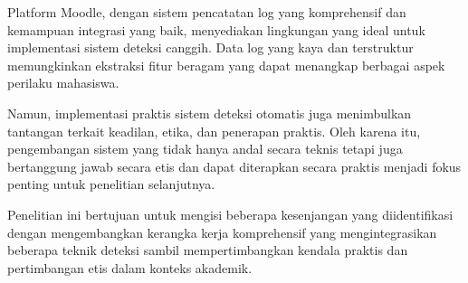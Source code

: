 Platform Moodle, dengan sistem pencatatan log yang komprehensif dan kemampuan integrasi yang baik, menyediakan lingkungan yang ideal untuk implementasi sistem deteksi canggih. Data log yang kaya dan terstruktur memungkinkan ekstraksi fitur beragam yang dapat menangkap berbagai aspek perilaku mahasiswa.

Namun, implementasi praktis sistem deteksi otomatis juga menimbulkan tantangan terkait keadilan, etika, dan penerapan praktis. Oleh karena itu, pengembangan sistem yang tidak hanya andal secara teknis tetapi juga bertanggung jawab secara etis dan dapat diterapkan secara praktis menjadi fokus penting untuk penelitian selanjutnya.

Penelitian ini bertujuan untuk mengisi beberapa kesenjangan yang diidentifikasi dengan mengembangkan kerangka kerja komprehensif yang mengintegrasikan beberapa teknik deteksi sambil mempertimbangkan kendala praktis dan pertimbangan etis dalam konteks akademik.
